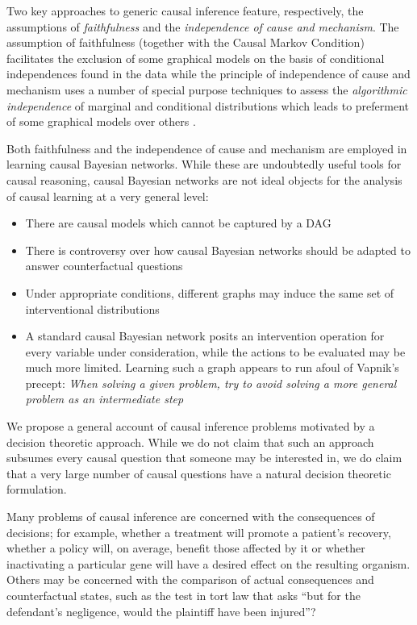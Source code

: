 Two key approaches to generic causal inference feature, respectively, the assumptions of \emph{faithfulness} and the \emph{independence of cause and mechanism}. The assumption of faithfulness (together with the Causal Markov Condition) facilitates the exclusion of some graphical models on the basis of conditional independences found in the data \cite{spirtes_causation_1993} while the principle of independence of cause and mechanism uses a number of special purpose techniques to assess the \emph{algorithmic independence} of marginal and conditional distributions which leads to preferment of some graphical models over others \cite{lemeire_replacing_2013, peters_identifiability_2012}.



Both faithfulness and the independence of cause and mechanism are employed in learning causal Bayesian networks. While these are undoubtedly useful tools for causal reasoning, causal Bayesian networks are not ideal objects for the analysis of causal learning at a very general level:
\begin{itemize}
    \item There are causal models which cannot be captured by a DAG \cite{dawid_beware_2010,bongers_theoretical_2016}
    \item There is controversy over how causal Bayesian networks should be adapted to answer counterfactual questions \cite{richardson2013single}
    \item Under appropriate conditions, different graphs may induce the same set of interventional distributions \cite{peters_structural_2015}
    \item A standard causal Bayesian network posits an intervention operation for every variable under consideration, while the actions to be evaluated may be much more limited. Learning such a graph appears to run afoul of Vapnik's precept: \emph{When solving a given problem, try to avoid solving a more general problem as an intermediate step} \cite{vapnik_nature_2013}
\end{itemize}

We propose a general account of causal inference problems motivated by a decision theoretic approach. While we do not claim that such an approach subsumes every causal question that someone may be interested in, we do claim that a very large number of causal questions have a natural decision theoretic formulation.

Many problems of causal inference are concerned with the consequences of decisions; for example, whether a treatment will promote a patient's recovery, whether a policy will, on average, benefit those affected by it or whether inactivating a particular gene will have a desired effect on the resulting organism. Others may be concerned with the comparison of actual consequences and counterfactual states, such as the test in tort law that asks ``but for the defendant's negligence, would the plaintiff have been injured''? 

